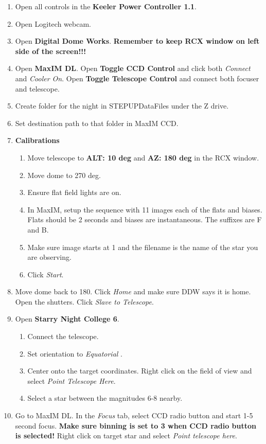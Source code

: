 \documentclass[11pt]{report}
\begin{document}
\begin{enumerate}
\item Open all controls in the {\bf Keeler Power Controller 1.1}.
\item Open Logitech webcam.
\item Open {\bf Digital Dome Works}. {\bf Remember to keep RCX window on left side of the screen!!!}
\item Open {\bf MaxIM DL}. Open {\bf Toggle CCD Control} and click both \emph{Connect} and \emph{Cooler On}. Open {\bf Toggle Telescope Control} and connect both focuser and telescope.
\item Create folder for the night in STEPUPDataFiles under the Z drive.
\item Set destination path to that folder in MaxIM CCD.
\item {\bf Calibrations}
\begin{enumerate}
\item Move telescope to {\bf ALT: 10 deg} and {\bf AZ: 180 deg} in the RCX window.
\item Move dome to 270 deg.
\item Ensure flat field lights are on.
\item In MaxIM, setup the sequence with 11 images each of the flats and biases. Flats should be 2 seconds and biases are instantaneous. The suffixes are F and B.
\item Make sure image starts at 1 and the filename is the name of the star you are observing.
\item Click \emph{Start}.
\end{enumerate}
\item Move dome back to 180. Click \emph{Home} and make sure DDW says it is home. Open the shutters. Click \emph{Slave to Telescope}.
\item Open {\bf Starry Night College 6}.
\begin{enumerate}
\item Connect the telescope.
\item Set orientation to \emph{Equatorial} .
\item Center onto the target coordinates. Right click on the field of view and select \emph{Point Telescope Here}.
\item Select a star between the magnitudes 6-8 nearby.
\end{enumerate}
\item Go to MaxIM DL. In the \emph{Focus} tab, select CCD radio button and start 1-5 second focus. {\bf Make sure binning is set to 3 when CCD radio button is selected!} Right click on target star and select \emph{Point telescope here}.

\end{enumerate}
\end{document}
